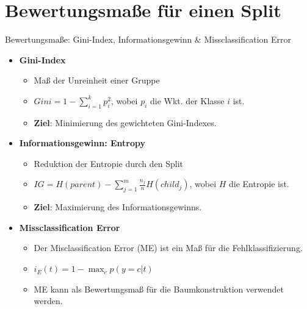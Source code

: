 \documentclass{beamer}
\begin{document}

\section{Bewertungsmaße für einen Split}

\begin{frame}{Bewertungsmaße: Gini-Index, Informationsgewinn \& Missclassification Error}
	\begin{itemize}
		\item{\textbf{Gini-Index}}
		\begin{itemize}
			\item Maß der Unreinheit einer Gruppe
			\item $Gini = 1 - \sum_{i=1}^k p_i^2$, wobei $p_i$ die Wkt. der Klasse $i$ ist.
			\item \textbf{Ziel}: Minimierung des gewichteten Gini-Indexes.
		\end{itemize}
		\item{\textbf{Informationsgewinn: Entropy}}
		\begin{itemize}
			\item Reduktion der Entropie durch den Split
			\item $IG = H(parent) - \sum_{j=1}^m \frac{n_j}{n} H(child_j)$, wobei $H$ die Entropie ist.
			\item \textbf{Ziel}: Maximierung des Informationsgewinns.
		\end{itemize}
		\item{\textbf{Missclassification Error}}
		\begin{itemize}
			\item {Der Misclassification Error (ME) ist ein Maß für die Fehlklassifizierung.}
			\item $i_E (t) = 1 - \max_c p(y = c | t)$
			\item {ME kann als Bewertungsmaß für die Baumkonstruktion verwendet werden.}
		\end{itemize}
	\end{itemize}
\end{frame}
\end{document}

